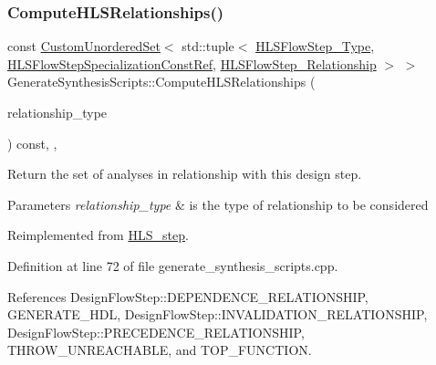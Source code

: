 \subsubsection{\texorpdfstring{Compute\+H\+L\+S\+Relationships()}{ComputeHLSRelationships()}}
{\footnotesize\ttfamily const \hyperlink{classCustomUnorderedSet}{Custom\+Unordered\+Set}$<$ std\+::tuple$<$ \hyperlink{hls__step_8hpp_ada16bc22905016180e26fc7e39537f8d}{H\+L\+S\+Flow\+Step\+\_\+\+Type}, \hyperlink{hls__step_8hpp_a5fdd2edf290c196531d21d68e13f0e74}{H\+L\+S\+Flow\+Step\+Specialization\+Const\+Ref}, \hyperlink{hls__step_8hpp_a3ad360b9b11e6bf0683d5562a0ceb169}{H\+L\+S\+Flow\+Step\+\_\+\+Relationship} $>$ $>$ Generate\+Synthesis\+Scripts\+::\+Compute\+H\+L\+S\+Relationships (\begin{DoxyParamCaption}\item[{const \hyperlink{classDesignFlowStep_a723a3baf19ff2ceb77bc13e099d0b1b7}{Design\+Flow\+Step\+::\+Relationship\+Type}}]{relationship\+\_\+type }\end{DoxyParamCaption}) const\hspace{0.3cm}{\ttfamily [override]}, {\ttfamily [protected]}, {\ttfamily [virtual]}}



Return the set of analyses in relationship with this design step. 


\begin{DoxyParams}{Parameters}
{\em relationship\+\_\+type} & is the type of relationship to be considered \\
\hline
\end{DoxyParams}


Reimplemented from \hyperlink{classHLS__step_aed0ce8cca9a1ef18e705fc1032ad4de5}{H\+L\+S\+\_\+step}.



Definition at line 72 of file generate\+\_\+synthesis\+\_\+scripts.\+cpp.



References Design\+Flow\+Step\+::\+D\+E\+P\+E\+N\+D\+E\+N\+C\+E\+\_\+\+R\+E\+L\+A\+T\+I\+O\+N\+S\+H\+IP, G\+E\+N\+E\+R\+A\+T\+E\+\_\+\+H\+DL, Design\+Flow\+Step\+::\+I\+N\+V\+A\+L\+I\+D\+A\+T\+I\+O\+N\+\_\+\+R\+E\+L\+A\+T\+I\+O\+N\+S\+H\+IP, Design\+Flow\+Step\+::\+P\+R\+E\+C\+E\+D\+E\+N\+C\+E\+\_\+\+R\+E\+L\+A\+T\+I\+O\+N\+S\+H\+IP, T\+H\+R\+O\+W\+\_\+\+U\+N\+R\+E\+A\+C\+H\+A\+B\+LE, and T\+O\+P\+\_\+\+F\+U\+N\+C\+T\+I\+ON.

\mbox{\label{classGenerateSynthesisScripts_aeba18d6961c98211710aa3ada02dc50e}} 
